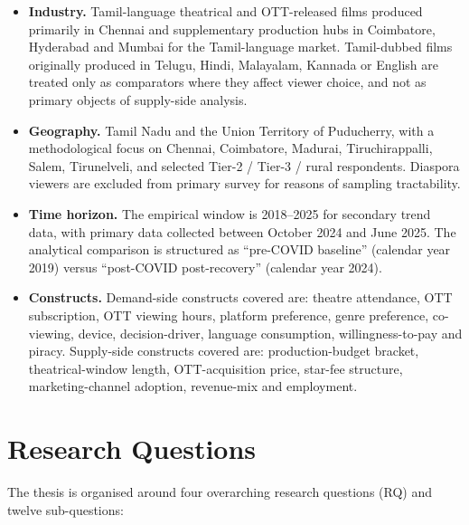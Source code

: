 \begin{itemize}[itemsep=2pt]
  \item \textbf{Industry.} Tamil-language theatrical and OTT-released
        films produced primarily in Chennai and supplementary
        production hubs in Coimbatore, Hyderabad and Mumbai for the
        Tamil-language market.  Tamil-dubbed films originally produced
        in Telugu, Hindi, Malayalam, Kannada or English are treated
        only as comparators where they affect viewer choice, and
        not as primary objects of supply-side analysis.
  \item \textbf{Geography.}  Tamil Nadu and the Union Territory of
        Puducherry, with a methodological focus on Chennai,
        Coimbatore, Madurai, Tiruchirappalli, Salem, Tirunelveli,
        and selected Tier-2 / Tier-3 / rural respondents.  Diaspora
        viewers are excluded from primary survey for reasons of
        sampling tractability.
  \item \textbf{Time horizon.}  The empirical window is 2018--2025
        for secondary trend data, with primary data collected
        between October 2024 and June 2025.  The analytical
        comparison is structured as ``pre-COVID baseline''
        (calendar year 2019) versus ``post-COVID post-recovery''
        (calendar year 2024).
  \item \textbf{Constructs.}  Demand-side constructs covered are:
        theatre attendance, OTT subscription, OTT viewing hours,
        platform preference, genre preference, co-viewing, device,
        decision-driver, language consumption, willingness-to-pay
        and piracy.  Supply-side constructs covered are:
        production-budget bracket, theatrical-window length,
        OTT-acquisition price, star-fee structure, marketing-channel
        adoption, revenue-mix and employment.
\end{itemize}

\section{Research Questions}
\label{sec:questions}

The thesis is organised around four overarching research questions
(RQ) and twelve sub-questions:

